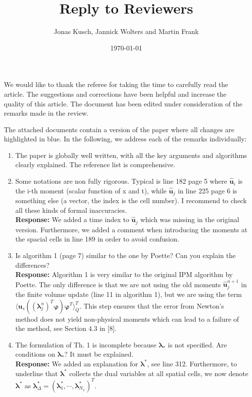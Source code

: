 \documentclass[11pt]{amsart}
\title{Reply to Reviewers}
\author{Jonas Kusch, Jannick Wolters and Martin Frank}
\date{\today}                                           %
\begin{document}
\maketitle

We would like to thank the referee for taking the time to carefully read the article. The suggestions and corrections have been helpful and increase the quality of this article. The document has been edited under consideration of the remarks made in the review.

\vspace{1em}

The attached documents contain a version of the paper where all changes are highlighted in blue. In the following, we address each of the remarks individually:

\begin{enumerate}
\item The paper is globally well written, with all the key arguments and algorithms clearly explained. The reference list is comprehensive.
\item Some notations are non fully rigorous. Typical is line 182 page 5 where $\bm{\hat u}_i$
is the i-th moment (scalar function of x and t), while $\bm{\hat u}_j$ in line 225 page
6 is something else (a vector, the index is the cell number). I recommend
to check all these kinds of formal inaccuracies.
\\ \textbf{Response:} We added a time index to $\bm{\hat u}_j$ which was missing in the original version. Furthermore, we added a comment when introducing the moments at the spacial cells in line 189 in order to avoid confusion.
\item Is algorithm 1 (page 7) similar to the one by Poette? Can you explain the differences?
\\ \textbf{Response:} Algorithm 1 is very similar to the original IPM algorithm by Poette. The only difference is that we are not using the old moments $\bm{\hat u}_j^{n+1}$ in the finite volume update (line 11 in algorithm 1), but we are using the term $\langle \bm u_{s}((\bm{\lambda}_j^n)^T\bm{\varphi})\bm{\varphi}^T\rangle_Q^T$. This step ensures that the error from Newton's method does not yield non-physical moments which can lead to a failure of the method, see Section 4.3 in [8].
\item The formulation of Th. 1 is incomplete because $\bm\lambda_*$ is not specified. Are
conditions on $\bm\lambda_*$? It must be explained.
\\ \textbf{Response:} We added an explanation for $\bm\lambda^*$, see line 312. Furthermore, to underline that $\bm\lambda^*$ collects the dual variables at all spatial cells, we now denote $\bm\lambda^*$ as $\bm{\lambda}_{\Delta}^*=(\bm{\lambda}_{1}^*,\cdots,\bm{\lambda}_{N_x}^*)^T$.

\end{enumerate}
\end{document}
